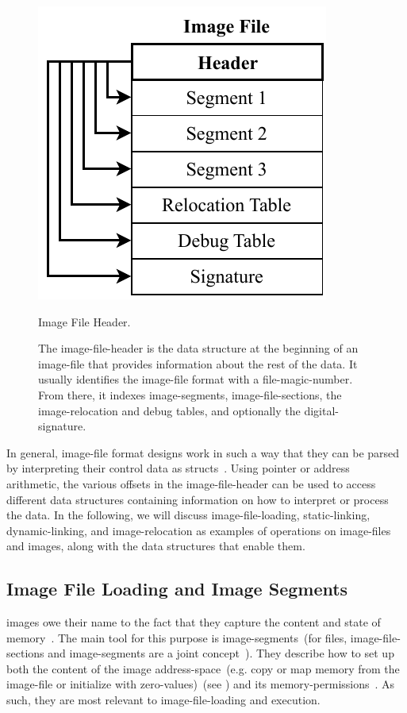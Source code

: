 \begin{figure}[htb]
  \centering
  \includegraphics{Figures/Header.pdf}
  \caption{Image File Header.}
  \label{fig:img_hdr}
  \caption*{The \gls{image-file-header} is the data structure at the beginning of an \gls{image-file} that provides information about the rest of the data. It usually identifies the \gls{image-file} format with a \gls{file-magic-number}. From there, it indexes \glspl{image-segment}, \glspl{image-file-section}, the \gls{image-relocation} and debug tables, and optionally the \gls{digital-signature}.}
\end{figure}

In general, \gls{image-file} format designs work in such a way that they can be parsed by interpreting their control data as  structs~\cite{elf-spec,macho-spec,pe-format}. Using pointer or address arithmetic, the various offsets in the \gls{image-file-header} can be used to access different data structures containing information on how to interpret or process the data. In the following, we will discuss \gls{image-file-loading}, \gls{static-linking}, \gls{dynamic-linking}, and \gls{image-relocation} as examples of operations on \glspl{image-file} and \glspl{image}, along with the data structures that enable them.

\subsection{Image File Loading and Image Segments}
\label{sec:segments}

\Glspl{image} owe their name to the fact that they capture the content and state of memory~\cite{levine2000linkers}. The main tool for this purpose is \glspl{image-segment}~(for  files, \glspl{image-file-section} and \glspl{image-segment} are a joint concept~\cite{pe-format}). They describe how to set up both the content of the \gls{image} \gls{address-space}~(e.g. copy or map memory from the \gls{image-file} or initialize with zero-values)~(see ) and its \gls{memory-permissions}~\cite{elf-spec,macho-spec,levine2000linkers}. As such, they are most relevant to \gls{image-file-loading} and execution.

